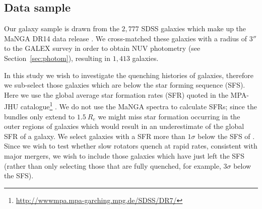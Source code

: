 \documentclass[useAMS,usenatbib]{mn2e}
\begin{document}
\subsection{Data sample}\label{sec:mangasample}

Our galaxy sample is drawn from the $2,777$ SDSS galaxies which make up the MaNGA DR14 data release \citep{dr14}. We cross-matched these galaxies with a radius of $3''$ to the GALEX survey in order to obtain NUV photometry (see Section~\ref{sec:photom}), resulting in $1,413$ galaxies.

\hypersetup{urlcolor=red}

In this study we wish to investigate the quenching histories of galaxies, therefore we sub-select those galaxies which are below the star forming sequence (SFS). Here we use the global average star formation rates (SFR) quoted in the MPA-JHU catalogue\footnote{\url{http://wwwmpa.mpa-garching.mpg.de/SDSS/DR7/}} \citep[][which are corrected for aperture bias]{kauffmann03, brinchmann04}. We do not use the MaNGA spectra to calculate SFRs; since the bundles only extend to $1.5~R_e$ we might miss star formation occurring in the outer regions of galaxies which would result in an underestimate of the global SFR of a galaxy. 
\hypersetup{urlcolor=black}
We select galaxies with a SFR more than $1\sigma$ below the SFS of \cite{peng10}. Since we wish to test whether slow rotators quench at rapid rates, consistent with major mergers, we wish to include those galaxies which have just left the SFS (rather than only selecting those that are fully quenched, for example, $3\sigma$ below the SFS).
\end{document}
